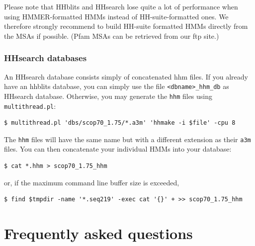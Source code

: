 \documentclass[11pt,a4paper]{article}
\begin{document}
Please note that HHblits and HHsearch lose quite a lot of performance when using HMMER-formatted HMMs instead of HH-suite-formatted ones. We therefore strongly recommend to build HH-suite formatted HMMs directly from the MSAs if possible. (Pfam MSAs can be retrieved from our ftp site.)


\subsubsection*{HHsearch databases}

An HHsearch database consists simply of concatenated hhm files. If you already have an hhblits database, you can simply use the file \verb`<dbname>_hhm_db` as HHsearch database. Otherwise, you may generate the \verb`hhm` files using \verb`multithread.pl`:
\begin{verbatim}
$ multithread.pl 'dbs/scop70_1.75/*.a3m' 'hhmake -i $file' -cpu 8 
\end{verbatim}
The \verb`hhm` files will have the same name but with a different extension as their \verb`a3m` files. You 
can then concatenate your individual HMMs into your database:
\begin{verbatim}
$ cat *.hhm > scop70_1.75_hhm
\end{verbatim}
or, if the maximum command line buffer size is exceeded, 
\begin{verbatim}
$ find $tmpdir -name '*.seq219' -exec cat '{}' + >> scop70_1.75_hhm
\end{verbatim}



\section{Frequently asked questions}
\end{document}
